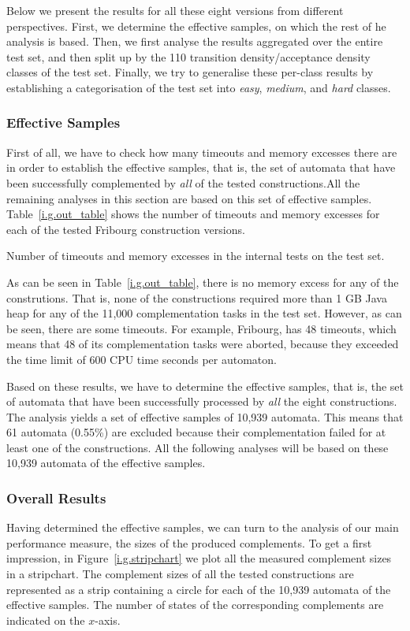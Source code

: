 Below we present the results for all these eight versions from different perspectives. First, we determine the effective samples, on which the rest of he analysis is based. Then, we first analyse the results aggregated over the entire test set, and then split up by the 110 transition density/acceptance density classes of the \goal{} test set. Finally, we try to generalise these per-class results by establishing a categorisation of the \goal{} test set into \textit{easy}, \textit{medium}, and \textit{hard} classes.

\subsubsection{Effective Samples}
First of all, we have to check how many timeouts and memory excesses there are in order to establish the effective samples, that is, the set of automata that have been successfully complemented by \textit{all} of the tested constructions.All the remaining analyses in this section are based on this set of effective samples. Table~\ref{i.g.out_table} shows the number of timeouts and memory excesses for each of the tested Fribourg construction versions.

\begin{table}[ht]
\centering

\caption{Number of timeouts and memory excesses in the internal tests on the \goal{} test set.}
\label{i.g.out_table}
\end{table}

As can be seen in Table~\ref{i.g.out_table}, there is no memory excess for any of the construtions. That is, none of the constructions required more than 1 GB Java heap for any of the 11,000 complementation tasks in the \goal{} test set. However, as can be seen, there are some timeouts. For example, Fribourg, has 48 timeouts, which means that 48 of its complementation tasks were aborted, because they exceeded the time limit of 600 CPU time seconds per automaton.

Based on these results, we have to determine the effective samples, that is, the set of automata that have been successfully processed by \textit{all} the eight constructions. The analysis yields a set of effective samples of 10,939 automata. This means that 61 automata (0.55\%) are excluded because their complementation failed for at least one of the constructions. All the following analyses will be based on these 10,939 automata of the effective samples.

\subsubsection{Overall Results}
Having determined the effective samples, we can turn to the analysis of our main performance measure, the sizes of the produced complements. To get a first impression, in Figure~\ref{i.g.stripchart} we plot all the measured complement sizes in a stripchart. The complement sizes of all the tested constructions are represented as a strip containing a circle for each of the 10,939 automata of the effective samples. The number of states of the corresponding complements are indicated on the $x$-axis.

